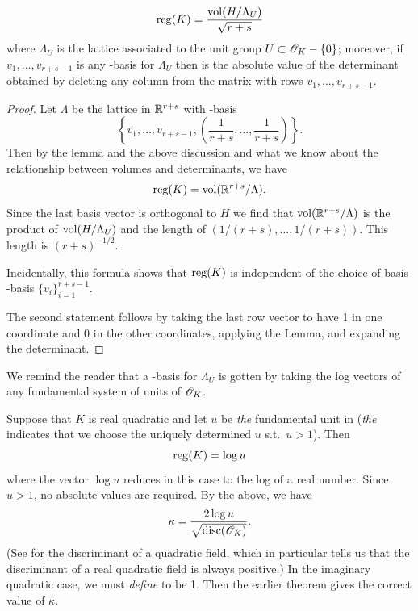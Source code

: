 \documentclass[10pt,a4paper,reqno]{amsart}
\begin{document}
\begin{thm}
\[\mathrm{reg}(K) = \frac{\mathrm{vol}(H/\Lambda_U)}{\sqrt{r+s}}\] where $\Lambda_U$ is the
lattice associated to the unit group $U \subset \mathscr{O}_K-\{0\}$; moreover, if
$v_1,\dots,v_{r+s-1}$ is any \Z-basis for $\Lambda_U$ then  is the
absolute value of the determinant obtained by deleting any column from the
matrix with rows $v_1,\dots,v_{r+s-1}$.
\end{thm}

\begin{proof}
Let $\Lambda$ be the lattice in $\mathbb{R}^{r+s}$ with \Z-basis
\[\left\{v_1,\dots,v_{r+s-1},\left( \frac{1}{r+s},\dots,\frac{1}{r+s} \right)
\right\}.\] Then by the lemma and the above discussion and what we know about
the relationship between volumes and determinants, we have \[\mathrm{reg}(K) =
\mathrm{vol}(\mathbb{R}^{r+s}/\Lambda).\] Since the last basis vector is orthogonal to $H$ we
find that $\mathrm{vol}(\mathbb{R}^{r+s}/\Lambda)$ is the product of $\mathrm{vol}(H/\Lambda_U)$ and
the length of $(1/(r+s),\dots,1/(r+s)).$ This length is $(r+s)^{-1/2}.$

Incidentally, this formula shows that $\mathrm{reg}(K)$ is independent of the choice of
basis \Z-basis $\{v_i\}_{i=1}^{r+s-1}.$

The second statement follows by taking the last row vector to have 1 in one
coordinate and 0 in the other coordinates, applying the Lemma, and expanding
the determinant.
\end{proof}

\begin{rem}
We remind the reader that a \Z-basis for $\Lambda_U$ is gotten by taking the
log vectors of any fundamental system of units of $\mathscr{O}_K$.
\end{rem}

\begin{eg}
Suppose that $K$ is real quadratic and let $u$ be \emph{the} fundamental unit
in \OK (\emph{the} indicates that we choose the uniquely determined $u$
s.t.~$u>1$). Then \[\mathrm{reg}(K) = \log u\] where the vector $\log u$ reduces in
this case to the log of a real number. Since $u>1$, no absolute values are
required. By the above, we have \[\kappa = \frac{2\log u}{\sqrt{\mathrm{disc}(\mathscr{O}_K)}}.\]
(See \cite[p.33]{M} for the discriminant of a quadratic field, which in
particular tells us that the discriminant of a real quadratic field is always
positive.) In the imaginary quadratic case, we must \emph{define}  to be
1. Then the earlier theorem gives the correct value of $\kappa.$
\end{eg}


\end{document}
